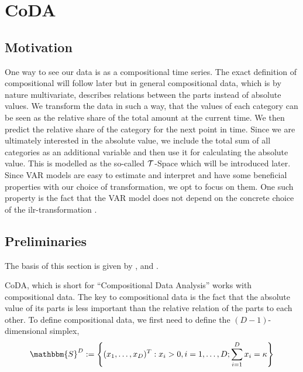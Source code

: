 \section{CoDA}
\label{sec:Coda}

\subsection{Motivation}
\label{sec: Coda Motivation}

One way to see our data is as a compositional time series. The exact definition of compositional will follow later but in general compositional data, which is by nature multivariate, describes relations between the parts instead of absolute values. We transform the data in such a way, that the values of each category can be seen as the relative share of the total amount at the current time. We then predict the relative share of the category for the next point in time. Since we are ultimately interested in the absolute value, we include the total sum of all categories as an additional variable and then use it for calculating the absolute value. This is modelled as the so-called $\mathcal{T}$-Space which will be introduced later. Since VAR models are easy to estimate and interpret and have some beneficial properties with our choice of transformation, we opt to focus on them. One such property is the fact that the VAR model does not depend on the concrete choice of the ilr-transformation \cite{Kynclova:2015}. 


\subsection{Preliminaries}
\label{sec: Coda Preliminaries}
The basis of this section is given by \cite{Kynclova:2015}, \cite{Egozcue:2003} and \cite{Filzmoser:2020}.

CoDA, which is short for "`Compositional Data Analysis"' works with compositional data. The key to compositional data is the fact that the absolute value of its parts is less important than the relative relation of the parts to each other. To define compositional data, we first need to define the $(D-1)$-dimensional simplex,
	\begin{equation}
	\mathbbm{S}^D := \left\{(x_1,\ldots, x_D)^T: x_i > 0, i =1,\ldots,D; \sum_{i=1}^{D}x_i=\kappa  \right\}
	\label{eq:Simplex Definition}
	\end{equation}
	
